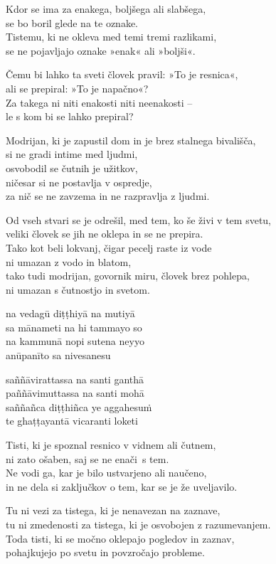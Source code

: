 \clearpage

Kdor se ima za enakega, boljšega ali slabšega,\\
se bo boril glede na te oznake.\\
Tistemu, ki ne okleva med temi tremi razlikami,\\
se ne pojavljajo oznake »enak« ali »boljši«.

Čemu bi lahko ta sveti človek pravil: »To je resnica«,\\
ali se prepiral: »To je napačno«?\\
Za takega ni niti enakosti niti neenakosti --\\
le s kom bi se lahko prepiral?

Modrijan, ki je zapustil dom in je brez stalnega bivališča,\\
si ne gradi intime med ljudmi,\\
osvobodil se čutnih je užitkov,\\\vin ničesar si ne postavlja v ospredje,\\
za nič se ne zavzema in ne razpravlja z ljudmi.

Od vseh stvari se je odrešil, med tem, ko še živi v tem svetu,\\
veliki človek se jih ne oklepa in se ne prepira.\\
Tako kot beli lokvanj, čigar pecelj raste iz vode\\
ni umazan z vodo in blatom,\\
tako tudi modrijan, govornik miru, človek brez pohlepa,\\
ni umazan s čutnostjo in svetom.


\clearpage

na vedagū diṭṭhiyā na mutiyā\\
sa mānameti na hi tammayo so\\
na kammunā nopi sutena neyyo\\
anūpanīto sa nivesanesu

saññāvirattassa na santi ganthā\\
paññāvimuttassa na santi mohā\\
saññañca diṭṭhiñca ye aggahesuṁ\\
te ghaṭṭayantā vicaranti loketi


\clearpage

Tisti, ki je spoznal resnico v vidnem ali čutnem,\\
ni zato ošaben, saj se ne enači s tem.\\
Ne vodi ga, kar je bilo ustvarjeno ali naučeno,\\
in ne dela si zaključkov o tem, kar se je že uveljavilo.

Tu ni vezi za tistega, ki je nenavezan na zaznave,\\
tu ni zmedenosti za tistega, ki je osvobojen z razumevanjem.\\
Toda tisti, ki se močno oklepajo pogledov in zaznav,\\
pohajkujejo po svetu in povzročajo probleme.

